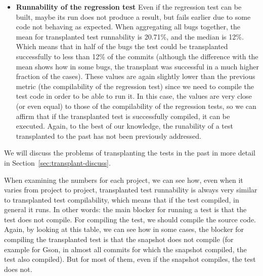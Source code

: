 \begin{itemize}
\item \textbf{Runnability of the regression test} Even if the regression test can be built, maybe its run does not produce a result, but fails earlier due to some code not behaving as expected. 
When aggregating all bugs together, the mean for transplanted test runnability is 20.71\%, and the median is 12\%. 
Which means that in half of the bugs the test could be transplanted successfully to less than 12\% of the commits (although the difference with the mean shows how in some bugs, the transplant was successful in a much higher fraction of the cases). 
These values are again slightly lower than the previous metric (the compilability of the regression test) since we need to compile the test code in order to be able to run it. In this case, the values are very close (or even equal) to those of the compilability of the regression tests, so we can affirm that if the transplanted test is successfully compiled, it can be executed.
Again, to the best of our knowledge, the runability of a test transplanted to the past has not been previously addressed.
\end{itemize}

We will discuss the problems of transplanting the tests in the past in more detail in Section~\ref{sec:transplant-discuss}.

When examining the numbers for each project, we can see how, even when it varies from project to project, transplanted test runnability is always very similar to transplanted test compilability, which means that if the test compiled, in general it runs. In other words: the main blocker for running a test is that the test does not compile. For compiling the test, we should compile the source code. Again, by looking at this table, we can see how in some cases, the blocker for compiling the transplanted test is that the snapshot does not compile (for example for Gson, in almost all commits for which the snapshot compiled, the test also compiled). But for most of them, even if the snapshot compiles, the test does not.

